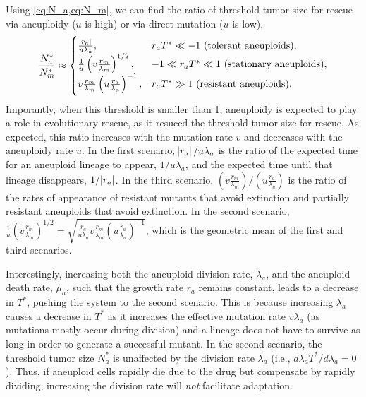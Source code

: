 \documentclass[12pt]{extarticle}
\renewcommand{\Delta}{r}
\begin{document}
Using \cref{eq:N_a,eq:N_m}, we can find the ratio of threshold tumor size for rescue via aneuploidy ($u$ is high) or via direct mutation ($u$ is low),
\begin{equation} \label{eq:N_ratio}
\frac{N^*_a}{N^*_m} \approx \begin{cases}
    \frac{\abs{\Delta_a}}{u\lambda_a} ,&
  \Delta_a T^* \ll -1 \text{ (tolerant aneuploids)} ,\\ 
  \frac{1}{u}\left(v  \frac{\Delta_m}{\lambda_m}\right)^{1/2} ,&
  -1 \ll \Delta_a T^* \ll 1 \text{ (stationary aneuploids)} ,\\ 
  v \frac{\Delta_m}{\lambda_m}  \left(u\frac{\Delta_a}{\lambda_a}\right)^{-1}  ,&
   \Delta_a T^* \gg 1 \text{ (resistant aneuploids)} .
  \end{cases}
\end{equation}
Imporantly, when this threshold is smaller than 1, aneuploidy is expected to play a role in evolutionary rescue, as it resuced the threshold tumor size for rescue. 
As expected, this ratio increases with the mutation rate $v$ and decreases with the aneuploidy rate $u$.
In the first scenario, $\abs{\Delta_a}/u\lambda_a$ is the ratio of the expected time for an aneuploid lineage to appear, $1/u\lambda_a$, and the expected time until that lineage disappears, $1/\abs{\Delta_a}$.
In the third scenario, $\left(v \frac{\Delta_m}{\lambda_m}\right) / \left(u \frac{\Delta_a}{\lambda_a}\right)$ is the ratio of the rates of appearance of resistant mutants that avoid extinction and partially resistant aneuploids that avoid extinction.
In the second scenario, $\frac{1}{u}\left(v  \frac{\Delta_m}{\lambda_m}\right)^{1/2}=\sqrt{\frac{\Delta_a}{u\lambda_a}  v \frac{\Delta_m}{\lambda_m}  \left(u\frac{\Delta_a}{\lambda_a}\right)^{-1}}$, which is the geometric mean of the first and third scenarios.

Interestingly, increasing both the aneuploid division rate, $\lambda_a$, and the aneuploid death rate, $\mu_a$, such that the growth rate $\Delta_a$ remains constant, leads to a decrease in $T^*$, pushing the system to the second scenario. This is because increasing $\lambda_a$ causes a decrease in $T^*$ as  it increases the effective mutation rate $v\lambda_a$ (as mutations mostly occur during division) and a lineage does not have to survive as long in order to generate a successful mutant. 
In the second scenario, the threshold tumor size $N_a^*$ is unaffected by the division rate $\lambda_a$ (i.e., $d \lambda_a T^*/d\lambda_a = 0$). Thus, if aneuploid cells rapidly die due to the drug but compensate by rapidly dividing, increasing the division rate will \emph{not} facilitate adaptation. %
\end{document}
